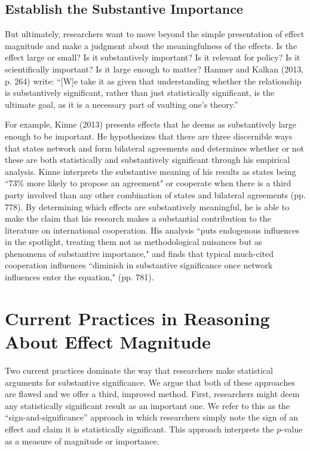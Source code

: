\documentclass[12pt]{article}
\begin{document}
\subsection*{Establish the Substantive Importance}

But ultimately, researchers want to move beyond the simple presentation of effect magnitude and make a judgment about the meaningfulness of the effects. Is the effect large or small? Is it substantively important? Is it relevant for policy? Is it scientifically important? Is it large enough to matter? Hanmer and Kalkan (2013, p. 264) write: ``[W]e take it as given that understanding whether the relationship is substantively significant, rather than just statistically significant, is the ultimate goal, as it is a necessary part of vaulting one's theory.''

For example, Kinne (2013) presents effects that he deems as substantively large enough to be important. He hypothesizes that there are three discernible ways that states network and form bilateral agreements and determines whether or not these are both statistically and substantively significant through his empirical analysis. Kinne interprets the substantive meaning of his results as states being ``73\% more likely to propose an agreement" or cooperate when there is a third party involved than any other combination of states and bilateral agreements (pp. 778). By determining which effects are substantively meaningful, he is able to make the claim that his research makes a substantial contribution to the literature on international cooperation. His analysis ``puts endogenous influences in the spotlight, treating them not as methodological nuisances but as phenomena of substantive importance," and finds that typical much-cited cooperation influences ``diminish in substantive significance once network influences enter the equation," (pp. 781). 

\section*{Current Practices in Reasoning About Effect Magnitude}

Two current practices dominate the way that researchers make statistical arguments for substantive significance. We argue that both of these approaches are flawed and we offer a third, improved method. First, researchers might deem any statistically significant result as an important one. We refer to this as the ``sign-and-significance'' approach in which researchers simply note the sign of an effect and claim it is statistically significant. This approach  interprets the $p$-value as a measure of magnitude or importance.
\end{document}
